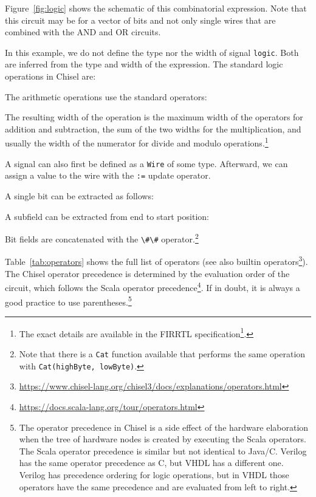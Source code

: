 \documentclass[%
    10pt,
    headinclude, footexclude,
    openright, %
    notitlepage,
    cleardoubleempty,
    headsepline,
    pointlessnumbers,
    bibtotoc, idxtotoc,
    ]{scrbook}
\newcommand{\code}[1]{{\lstinline[basicstyle=\small\ttfamily]{#1}}}
\newcommand{\codefoot}[1]{{\lstinline[basicstyle=\footnotesize\ttfamily]{#1}}}
\newcommand{\myref}[2]{\href{#1}{#2}}
\renewcommand{\myref}[2]{{#2}{\footnote{\url{#1}}}}
\begin{document}
\noindent Figure~\ref{fig:logic} shows the schematic of this combinatorial expression.
Note that this circuit may be for a vector of bits and not only single wires
that are combined with the AND and OR circuits.

In this example, we do not define the type nor the width of signal \code{logic}.
Both are inferred from the type and width of the expression.
The standard logic operations in Chisel are:



\noindent The arithmetic operations use the standard operators:



\noindent The resulting width of the operation is the maximum width of the operators for
addition and subtraction, the sum of the two widths for the multiplication, and usually
the width of the numerator for divide and modulo operations.\footnote{The exact
details are available in the \myref{https://github.com/chipsalliance/firrtl-spec/releases/latest/download/spec.pdf}{FIRRTL specification}.}

A signal can also first be defined as a \code{Wire} of some type. Afterward, we can assign a
value to the wire with the \code{:=} update operator.


A single bit can be extracted as follows:

\noindent A subfield can be extracted from end to start position:

\noindent Bit fields are concatenated with the \code{\#\#} operator.\footnote{Note that there is a \codefoot{Cat} function available that performs the same
operation with \codefoot{Cat(highByte, lowByte)}.}


Table~\ref{tab:operators} shows the full list of operators
(see also \myref{https://www.chisel-lang.org/chisel3/docs/explanations/operators.html}{builtin operators}).
The Chisel operator precedence is determined by the evaluation order of the circuit,
which follows the \myref{https://docs.scala-lang.org/tour/operators.html}{Scala operator precedence}.
If in doubt, it is always a good practice to use parentheses.\footnote{The operator precedence in
Chisel is a side effect of the hardware elaboration when the tree of hardware nodes
is created by executing the Scala operators. The Scala operator precedence is similar but
not identical to Java/C. Verilog has the same operator precedence as C, but VHDL
has a different one. Verilog has precedence ordering for logic operations, but in VHDL
those operators have the same precedence and are evaluated from left to right.}
\end{document}
